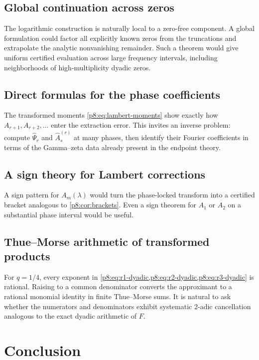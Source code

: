 \documentclass[11pt]{article}
\numberwithin{equation}{section}
\theoremstyle{definition}
\theoremstyle{remark}
\begin{document}
\subsection{Global continuation across zeros}

The logarithmic construction is naturally local to a zero-free component. A global formulation could factor all explicitly known zeros from the truncations and extrapolate the analytic nonvanishing remainder. Such a theorem would give uniform certified evaluation across large frequency intervals, including neighborhoods of high-multiplicity dyadic zeros.

\subsection{Direct formulas for the phase coefficients}

The transformed moments \cref{p8:eq:lambert-moments} show exactly how $A_{r+1},A_{r+2},\ldots$ enter the extraction error. This invites an inverse problem: compute $\widehat\Psi_r$ and $\widehat A_s^{(r)}$ at many phases, then identify their Fourier coefficients in terms of the Gamma--zeta data already present in the endpoint theory.

\subsection{A sign theory for Lambert corrections}

A sign pattern for $A_m(\lambda)$ would turn the phase-locked transform into a certified bracket analogous to \cref{p8:cor:brackets}. Even a sign theorem for $A_1$ or $A_2$ on a substantial phase interval would be useful.

\subsection{Thue--Morse arithmetic of transformed products}

For $q=1/4$, every exponent in \cref{p8:eq:r1-dyadic,p8:eq:r2-dyadic,p8:eq:r3-dyadic} is rational. Raising to a common denominator converts the approximant to a rational monomial identity in finite Thue--Morse sums. It is natural to ask whether the numerators and denominators exhibit systematic $2$-adic cancellation analogous to the exact dyadic arithmetic of $F$.

\section{Conclusion}
\end{document}
